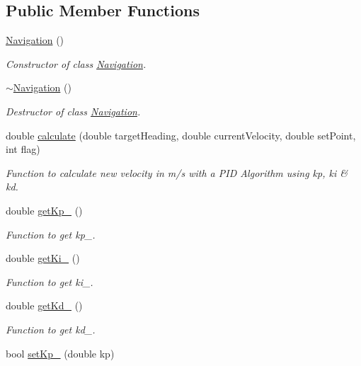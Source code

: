 \subsection*{Public Member Functions}
\begin{DoxyCompactItemize}
\item 
\hyperlink{class_navigation_a81fdffdefe46340da5fa6c570066b42b}{Navigation} ()
\begin{DoxyCompactList}\small\item\em Constructor of class \hyperlink{class_navigation}{Navigation}. \end{DoxyCompactList}\item 
\hyperlink{class_navigation_addd4022d716df48f4e55a1db69361ba7}{$\sim$\+Navigation} ()
\begin{DoxyCompactList}\small\item\em Destructor of class \hyperlink{class_navigation}{Navigation}. \end{DoxyCompactList}\item 
double \hyperlink{class_navigation_a0f83b511cec12a68f2c3466c40c5d3cb}{calculate} (double target\+Heading, double current\+Velocity, double set\+Point, int flag)
\begin{DoxyCompactList}\small\item\em Function to calculate new velocity in m/s with a P\+ID Algorithm using kp, ki \& kd. \end{DoxyCompactList}\item 
double \hyperlink{class_navigation_ab1469d74f4838a9d32a8647d22701f9f}{get\+Kp\+\_\+} ()
\begin{DoxyCompactList}\small\item\em Function to get kp\+\_\+. \end{DoxyCompactList}\item 
double \hyperlink{class_navigation_a1a84392d6cce3f60df452ab482b5647c}{get\+Ki\+\_\+} ()
\begin{DoxyCompactList}\small\item\em Function to get ki\+\_\+. \end{DoxyCompactList}\item 
double \hyperlink{class_navigation_ac6441bb601483166ef7a8081b76f634d}{get\+Kd\+\_\+} ()
\begin{DoxyCompactList}\small\item\em Function to get kd\+\_\+. \end{DoxyCompactList}\item 
bool \hyperlink{class_navigation_a6dd95f46ff4ecc69895452a1879c30af}{set\+Kp\+\_\+} (double kp)

\end{DoxyCompactItemize}
